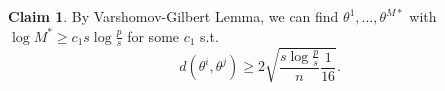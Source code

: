 \documentclass[twoside]{article}
\theoremstyle{definition}
\theoremstyle{definition}
\newtheorem*{claim}{Claim}
\theoremstyle{remark}
\begin{document}
\begin{claim}
By Varshomov-Gilbert Lemma, we can find $\theta^1, \ldots, \theta^{M*}$ with $\log M^* \geq c_1 s \log \frac{p}{s}$ for some $c_1$ s.t.
\[
d(\theta^i, \theta^j) \geq 2 \sqrt{\frac{s \log \frac{p}{s}}{n} \frac{1}{16}}.
\]
\end{claim}

\nocite{*}


\end{document}
